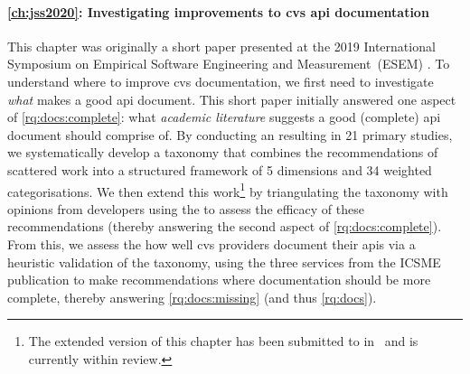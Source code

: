 \paragraph{\cref{ch:jss2020}: Investigating improvements to \gls{cvs} \gls{api} documentation} This chapter was originally a short paper presented at the 2019 International Symposium on Empirical Software Engineering and Measurement~(ESEM) \citep{Cummaudo:2020icse}. To understand where to improve \gls{cvs} documentation, we first need to investigate \textit{what} makes a good \gls{api} document. This short paper initially answered one aspect of \ref{rq:docs:complete}: what \textit{academic literature} suggests a good (complete) \gls{api} document should comprise of. By conducting an  resulting in 21 primary studies, we systematically develop a taxonomy that combines the recommendations of scattered work into a structured framework of 5 dimensions and 34 weighted categorisations. We then extend this work\footnote{The extended version of this chapter has been submitted to  in~\citep{Cummaudo:2020jss} and is currently within review.} by triangulating the taxonomy with opinions from developers using the  to assess the efficacy of these recommendations (thereby answering the second aspect of \ref{rq:docs:complete}). From this, we assess the how well \gls{cvs} providers document their \glspl{api} via a heuristic validation of the taxonomy, using the three services from the ICSME publication to make recommendations where documentation should be more complete, thereby answering \ref{rq:docs:missing} (and thus \ref{rq:docs}).

